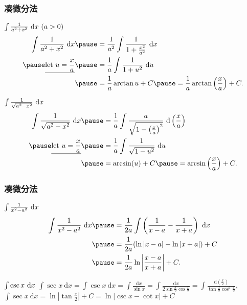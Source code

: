 \documentclass[
10pt,
aspectratio=43,
]{beamer}
\begin{document}
\begin{frame}
	\frametitle{凑微分法}
	\everymath{\displaystyle}
	{\small
		\begin{exampleblock}{$\color{black}\int \frac{1}{a^2+x^2} \mathrm{~d}x\,\,(a>0)$}
			$$
				\begin{aligned}
					\int \frac{1}{a^2+x^2} \mathrm{~d}x        & \pause = \frac{1}{a^2} \int \frac{1}{1+\frac{x^2}{a^2}} \mathrm{~d}x                     \\
					\pause\underline{\text{let }u=\frac{x}{a}} & \pause =  \frac{1}{a} \int \frac{1}{1+u^2} \mathrm{~d}u                                  \\
					                                           & \pause = \frac{1}{a} \arctan u+C \pause = \frac{1}{a} \arctan\left(\frac{x}{a}\right)+C.
				\end{aligned}
			$$
		\end{exampleblock}
		\pause
		\begin{exampleblock}{$\color{black}\int \frac{1}{\sqrt{a^2-x^2}} \mathrm{~d}x$}
			$$
				\begin{aligned}
					\int \frac{1}{\sqrt{a^2-x^2}} \mathrm{~d}x & \pause = \frac{1}{a} \int \frac{a}{\sqrt{1-\left(\frac{x}{a}\right)^2}} \mathrm{~d}\left(\frac{x}{a}\right) \\
					\pause\underline{\text{let }u=\frac{x}{a}} & \pause =  \frac{1}{a} \int \frac{1}{\sqrt{1-u^2}} \mathrm{~d}u                                              \\
					                                           & \pause = \arcsin(u)+C \pause = \arcsin\left(\frac{x}{a}\right)+C.
				\end{aligned}
			$$
		\end{exampleblock}
	}
\end{frame}


\begin{frame}
	\frametitle{凑微分法}
	\everymath{\displaystyle}
	\begin{exampleblock}{$\color{black}\int \frac{1}{x^2-a^2} \mathrm{~d}x$}
		$$
			\begin{aligned}
				\int \frac{1}{x^2-a^2} \mathrm{~d}x & \pause  = \frac{1}{2a} \int \left(\frac{1}{x-a}-\frac{1}{x+a}\right) \mathrm{~d}x \\
				                                    & \pause = \frac{1}{2a}(\ln |x-a|-\ln |x+a|)+C                                      \\
				                                    & \pause  = \frac{1}{2a} \ln \left|\frac{x-a}{x+a}\right|+C.
			\end{aligned}
		$$
	\end{exampleblock}
	\pause
	\begin{exampleblock}{$\color{black}\int \csc x \mathrm{~d}x$}
		$
			\int \sec x \mathrm{~d}x   = \int \csc x \mathrm{~d} x=\int \frac{\mathrm{d} x}{\sin x}=\int \frac{\mathrm{d} x}{2 \sin \frac{x}{2} \cos \frac{x}{2}}=\int \frac{\mathrm{d}\left(\frac{x}{2}\right)}{\tan \frac{x}{2} \cos ^2 \frac{x}{2}},
		$\\
		$
			\int \sec x \mathrm{~d}x =\ln \left|\tan \frac{x}{2}\right|+C  =\ln |\csc x-\cot x|+C
		$
	\end{exampleblock}
\end{frame}
\end{document}
